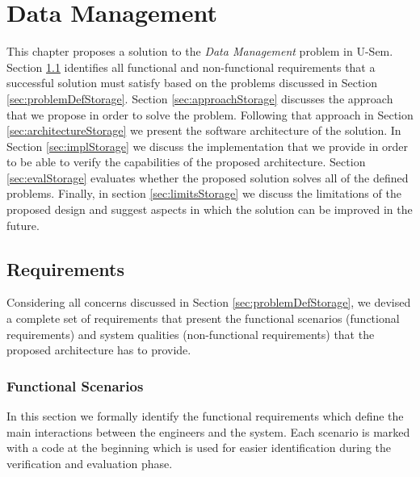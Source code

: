 \chapter{Data Management} 
\label{cha:data}

This chapter proposes a solution to the \textit{Data Management} problem in U-Sem. Section \ref{sec:storageReq} identifies all functional and non-functional requirements that a successful solution must satisfy based on the problems discussed in Section \ref{sec:problemDefStorage}. Section \ref{sec:approachStorage} discusses the approach that we propose in order to solve the problem. Following that approach in Section \ref{sec:architectureStorage} we present the software architecture of the solution. In Section \ref{sec:implStorage} we discuss the implementation that we provide in order to be able to verify the capabilities of the proposed architecture. Section \ref{sec:evalStorage} evaluates whether the proposed solution solves all of the defined problems. Finally, in section \ref{sec:limitsStorage} we discuss the limitations of the proposed design and suggest aspects in which the solution can be improved in the future.

\section{Requirements}
\label{sec:storageReq}

Considering all concerns discussed in Section \ref{sec:problemDefStorage}, we devised a complete set of requirements that present the functional scenarios (functional requirements) and system qualities (non-functional requirements) that the proposed architecture has to provide.

\subsection{Functional Scenarios}
In this section we formally identify the functional requirements which define the main interactions between the engineers and the system. Each scenario is marked with a code at the beginning which is used for easier identification during the verification and evaluation phase.

